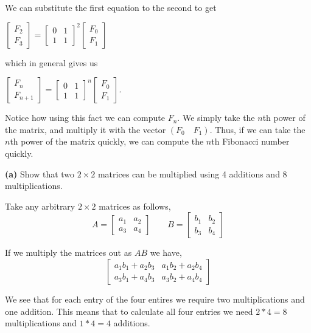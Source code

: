 \documentclass[12pt]{article}
\begin{document}
{    We can substitute the first equation to the second to get 

    \begin{center}
    \begin{minipage}{0.25\textwidth}
    $\begin{bmatrix}F_2 \\ F_3\end{bmatrix} = \begin{bmatrix}
        0 & 1 \\ 1 & 1
    \end{bmatrix}^2\begin{bmatrix}F_0 \\ F_1\end{bmatrix}$
    \end{minipage}
    \begin{minipage}{0.25\textwidth}
    \centering
    which in general gives us
    \end{minipage}
    \begin{minipage}{0.25\textwidth}
    $\begin{bmatrix}F_n \\ F_{n+1}\end{bmatrix} = \begin{bmatrix}
        0 & 1 \\ 1 & 1
    \end{bmatrix}^n\begin{bmatrix}F_0 \\ F_1\end{bmatrix}.$
    \end{minipage}
    \end{center}

    Notice how using this fact we can compute $F_n$. We simply take the $n$th power of the matrix, and multiply it with the vector $(F_0 \hspace{1em} F_1)$. Thus, if we can take the $n$th power of the matrix quickly, we can compute the $n$th Fibonacci number quickly.
}

\textbf{(a)} Show that two $2 \times 2$ matrices can be multiplied using 4 additions and 8 multiplications.
\begin{answer}
    Take any arbitrary $2 \times 2$ matrices as follows, 
    $$ A =  \begin{bmatrix}
        a_1 & a_2 \\ a_3 & a_4
    \end{bmatrix} \qquad B =  \begin{bmatrix}
        b_1 & b_2 \\ b_3 & b_4
    \end{bmatrix}$$ 

    If we multiply the matrices out as $AB$ we have,  
    $$ \begin{bmatrix} a_1b_1 + a_2b_3 & a_1b_2 + a_2b_4 \\ a_3b_1 + a_4b_3 & a_3b_2 + a_4b_4\end{bmatrix} $$ 

    We see that for each entry of the four entires we require two multiplications and one addition. This means that to calculate all four entries we need $2 * 4 = 8$ multiplications and $1 * 4 = 4$ additions.
\end{answer}
\end{document}
